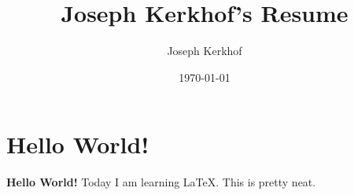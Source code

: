 \documentclass{article} %
\title{Joseph Kerkhof's Resume} %
\author{Joseph Kerkhof} %
\date{\today} %
\begin{document}
    \maketitle %

    \section{Hello World!} %

    \textbf{Hello World!} Today I am learning \LaTeX. This is pretty neat.
\end{document}

